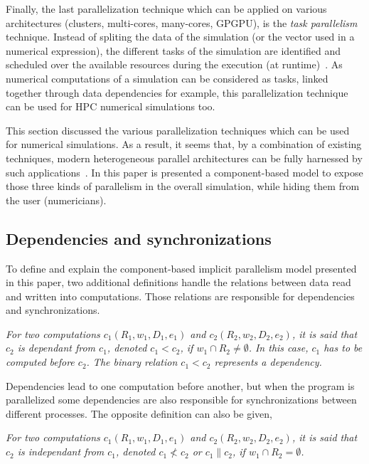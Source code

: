 Finally, the last parallelization technique which can be applied on various architectures (clusters, multi-cores, many-cores, GPGPU), is the \textit{task parallelism} technique. Instead of spliting the data of the simulation (or the vector used in a numerical expression), the different tasks of the simulation are identified and scheduled over the available resources during the execution (at runtime)~\cite{}. As numerical computations of a simulation can be considered as tasks, linked together through data dependencies for example, this parallelization technique can be used for HPC numerical simulations too.

This section discussed the various parallelization techniques which can be used for numerical simulations. As a result, it seems that, by a combination of existing techniques, modern heterogeneous parallel architectures can be fully harnessed by such applications~\cite{}. In this paper is presented a component-based model to expose those three kinds of parallelism in the overall simulation, while hiding them from the user (numericians).

\subsection{Dependencies and synchronizations}
\label{sect:dep}
To define and explain the component-based implicit parallelism model presented in this paper, two additional definitions handle the relations between data read and written into computations. Those relations are responsible for dependencies and synchronizations.

\medskip
\begin{mydef}
\textit{For two computations $c_1(R_1,w_1,D_1,e_1)$ and $c_2(R_2,w_2,D_2,e_2)$, it is said that $c_2$ is dependant from $c_1$, denoted $c_1<c_2$, if $w_1 \cap R_2 \neq \emptyset$. In this case, $c_1$ has to be computed before $c_2$. The binary relation $c_1<c_2$ represents a \textit{dependency}.}
\end{mydef}

\medskip
Dependencies lead to one computation before another, but when the program is parallelized some dependencies are also responsible for synchronizations between different processes. The opposite definition can also be given, 

\medskip
\begin{mydef}
\textit{For two computations $c_1(R_1,w_1,D_1,e_1)$ and $c_2(R_2,w_2,D_2,e_2)$, it is said that $c_2$ is independant from $c_1$, denoted $c_1 \not <c_2$ or $c_1 \parallel c_2$, if $w_1 \cap R_2 = \emptyset$.}
\end{mydef}


